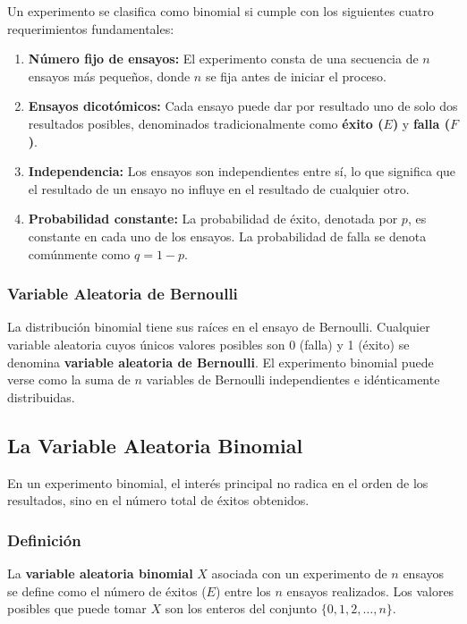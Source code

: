 \documentclass[a4paper]{article}
\begin{document}
Un experimento se clasifica como binomial si cumple con los siguientes cuatro requerimientos fundamentales:

\begin{enumerate}
    \item \textbf{Número fijo de ensayos:} El experimento consta de una secuencia de $n$ ensayos más pequeños, donde $n$ se fija antes de iniciar el proceso.
    \item \textbf{Ensayos dicotómicos:} Cada ensayo puede dar por resultado uno de solo dos resultados posibles, denominados tradicionalmente como \textbf{éxito ($E$)} y \textbf{falla ($F$)}.
    \item \textbf{Independencia:} Los ensayos son independientes entre sí, lo que significa que el resultado de un ensayo no influye en el resultado de cualquier otro.
    \item \textbf{Probabilidad constante:} La probabilidad de éxito, denotada por $p$, es constante en cada uno de los ensayos. La probabilidad de falla se denota comúnmente como $q = 1 - p$.
\end{enumerate}

\subsubsection{Variable Aleatoria de Bernoulli}

La distribución binomial tiene sus raíces en el ensayo de Bernoulli. Cualquier variable aleatoria cuyos únicos valores posibles son 0 (falla) y 1 (éxito) se denomina \textbf{variable aleatoria de Bernoulli}. El experimento binomial puede verse como la suma de $n$ variables de Bernoulli independientes e idénticamente distribuidas.

\subsection{La Variable Aleatoria Binomial}

En un experimento binomial, el interés principal no radica en el orden de los resultados, sino en el número total de éxitos obtenidos.

\subsubsection{Definición}

La \textbf{variable aleatoria binomial} $X$ asociada con un experimento de $n$ ensayos se define como el número de éxitos ($E$) entre los $n$ ensayos realizados. Los valores posibles que puede tomar $X$ son los enteros del conjunto $\{0, 1, 2, \dots, n\}$.
\end{document}
